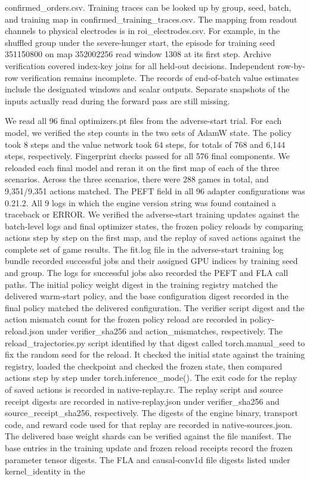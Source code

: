 \documentclass{article}
\begin{document}
confirmed\_\allowbreak{}orders.csv. Training traces can be looked up by group, seed, batch, and training map in confirmed\_\allowbreak{}training\_\allowbreak{}traces.csv. The mapping from readout channels to physical electrodes is in roi\_\allowbreak{}electrodes.csv. For example, in the shuffled group under the severe-hunger start, the episode for training seed 351150800 on map 352002256 read window 1308 at its first step. Archive verification covered index-key joins for all held-out decisions. Independent row-by-row verification remains incomplete. The records of end-of-batch value estimates include the designated windows and scalar outputs. Separate snapshots of the inputs actually read during the forward pass are still missing.


We read all 96 final optimizers.pt files from the adverse-start trial. For each model, we verified the step counts in the two sets of AdamW state. The policy took 8 steps and the value network took 64 steps, for totals of 768 and 6,144 steps, respectively. Fingerprint checks passed for all 576 final components. We reloaded each final model and reran it on the first map of each of the three scenarios. Across the three scenarios, there were 288 games in total, and 9,351/9,351 actions matched. The PEFT field in all 96 adapter configurations was 0.21.2. All 9 logs in which the engine version string was found contained a traceback or ERROR. We verified the adverse-start training updates against the batch-level logs and final optimizer states, the frozen policy reloads by comparing actions step by step on the first map, and the replay of saved actions against the complete set of game results. The fit.log file in the adverse-start training log bundle recorded successful jobs and their assigned GPU indices by training seed and group. The logs for successful jobs also recorded the PEFT and FLA call paths. The initial policy weight digest in the training registry matched the delivered warm-start policy, and the base configuration digest recorded in the final policy matched the delivered configuration. The verifier script digest and the action mismatch count for the frozen policy reload are recorded in policy-reload.json under verifier\_\allowbreak{}sha256 and action\_\allowbreak{}mismatches, respectively. The reload\_\allowbreak{}trajectories.py script identified by that digest called torch.manual\_\allowbreak{}seed to fix the random seed for the reload. It checked the initial state against the training registry, loaded the checkpoint and checked the frozen state, then compared actions step by step under torch.inference\_\allowbreak{}mode(). The exit code for the replay of saved actions is recorded in native-replay.rc. The replay script and source receipt digests are recorded in native-replay.json under verifier\_\allowbreak{}sha256 and source\_\allowbreak{}receipt\_\allowbreak{}sha256, respectively. The digests of the engine binary, transport code, and reward code used for that replay are recorded in native-sources.json. The delivered base weight shards can be verified against the file manifest. The base entries in the training update and frozen reload receipts record the frozen parameter tensor digests. The FLA and causal-conv1d file digests listed under kernel\_\allowbreak{}identity in the 
\end{document}
